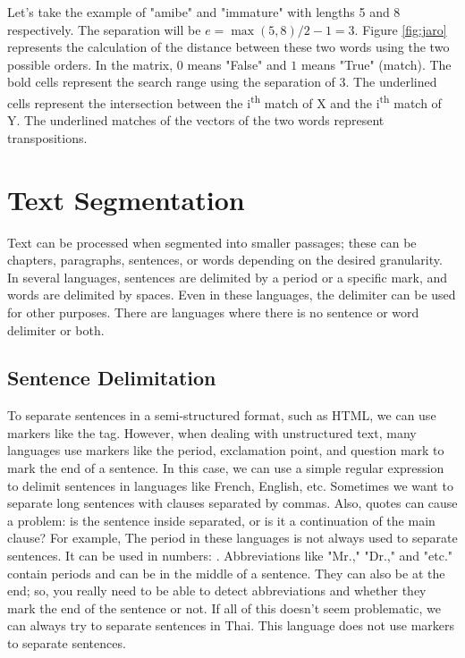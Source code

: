 \documentclass{KBook}
\begin{document}
Let's take the example of "amibe" and "immature" with lengths 5 and 8 respectively. The separation will be $e=\max(5, 8)/2 - 1 = 3$. Figure \ref{fig:jaro} represents the calculation of the distance between these two words using the two possible orders. In the matrix, $0$ means "False" and $1$ means "True" (match). The bold cells represent the search range using the separation of 3. The underlined cells represent the intersection between the i\textsuperscript{th} match of X and the i\textsuperscript{th} match of Y. The underlined matches of the vectors of the two words represent transpositions.

\section{Text Segmentation}

Text can be processed when segmented into smaller passages; these can be chapters, paragraphs, sentences, or words depending on the desired granularity. In several languages, sentences are delimited by a period or a specific mark, and words are delimited by spaces. Even in these languages, the delimiter can be used for other purposes. There are languages where there is no sentence or word delimiter or both.

\subsection{Sentence Delimitation}

To separate sentences in a semi-structured format, such as HTML, we can use markers like the  tag. However, when dealing with unstructured text, many languages use markers like the period, exclamation point, and question mark to mark the end of a sentence. In this case, we can use a simple regular expression \expword{/[.?!]/} to delimit sentences in languages like French, English, etc. Sometimes we want to separate long sentences with clauses separated by commas. Also, quotes can cause a problem: is the sentence inside separated, or is it a continuation of the main clause? For example,  The period in these languages is not always used to separate sentences. It can be used in numbers: . Abbreviations like "Mr.," "Dr.," and "etc." contain periods and can be in the middle of a sentence. They can also be at the end; so, you really need to be able to detect abbreviations and whether they mark the end of the sentence or not. If all of this doesn't seem problematic, we can always try to separate sentences in Thai. This language does not use markers to separate sentences.
\end{document}

